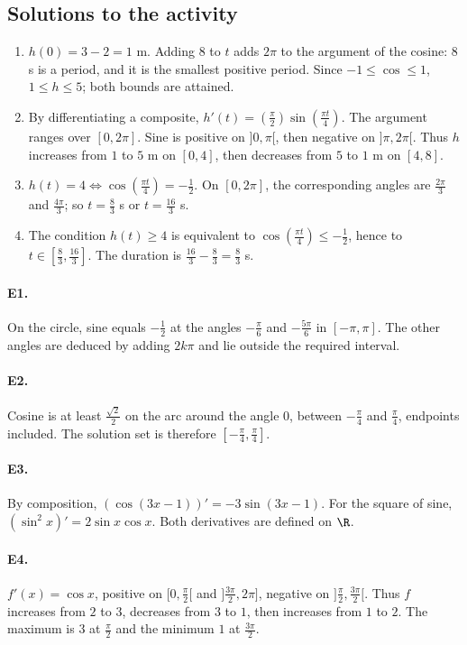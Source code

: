 \subsection{Solutions to the activity}\begin{enumerate}
\item $h(0)=3-2=1$ m. Adding $8$ to $t$ adds $2\pi$ to the argument of the cosine: $8$ s is a period, and it is the smallest positive period. Since $-1\le\cos\le1$, $1\le h\le5$; both bounds are attained.
\item By differentiating a composite, $h'(t)=(\frac{\pi}{2})\sin (\frac{\pi t}{4})$. The argument ranges over $[0,2\pi]$. Sine is positive on $]0,\pi[$, then negative on $]\pi,2\pi[$. Thus $h$ increases from $1$ to $5$ m on $[0,4]$, then decreases from $5$ to $1$ m on $[4,8]$.
\item $h(t)=4\Longleftrightarrow\cos (\frac{\pi t}{4})=-\frac{1}{2}$. On $[0,2\pi]$, the corresponding angles are $\frac{2\pi}{3}$ and $\frac{4\pi}{3}$; so $t=\frac{8}{3}$ s or $t=\frac{16}{3}$ s.
\item The condition $h(t)\ge4$ is equivalent to $\cos (\frac{\pi t}{4})\le-\frac{1}{2}$, hence to $t\in[\frac{8}{3},\frac{16}{3}]$. The duration is $\frac{16}{3}-\frac{8}{3}=\frac{8}{3}$ s.
\end{enumerate}

\paragraph{E1.}On the circle, sine equals $-\frac{1}{2}$ at the angles $-\frac{\pi}{6}$ and $-\frac{5\pi}{6}$ in $[-\pi,\pi]$. The other angles are deduced by adding $2k\pi$ and lie outside the required interval.

\paragraph{E2.}Cosine is at least $\frac{\sqrt{2}}{2}$ on the arc around the angle $0$, between $-\frac{\pi}{4}$ and $\frac{\pi}{4}$, endpoints included. The solution set is therefore $[-\frac{\pi}{4},\frac{\pi}{4}]$.

\paragraph{E3.}By composition, $(\cos(3x-1))'=-3\sin(3x-1)$. For the square of sine, $(\sin^2x)'=2\sin x\cos x$. Both derivatives are defined on $\R$.

\paragraph{E4.}$f'(x)=\cos x$, positive on $[0,\frac{\pi}{2}[$ and $]\frac{3\pi}{2},2\pi]$, negative on $]\frac{\pi}{2},\frac{3\pi}{2}[$. Thus $f$ increases from $2$ to $3$, decreases from $3$ to $1$, then increases from $1$ to $2$. The maximum is $3$ at $\frac{\pi}{2}$ and the minimum $1$ at $\frac{3\pi}{2}$.

